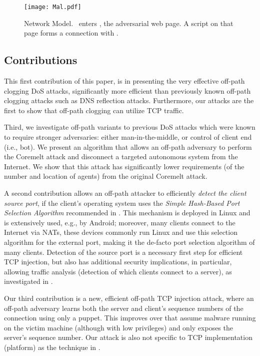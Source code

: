 \documentclass[conference]{IEEEtran}
\newcommand{\scom}{\mbox{}}
\newcommand{\malcom}{\mbox{}}\newcommand{\victimserv}{\mbox{}}\newcommand{\malcoma}{\mbox{}}
\begin{document}
\begin{figure}
  \begin{center}
    \texttt{[image: Mal.pdf]}
  \end{center}
  \caption{Network Model. \wini\ enters \malcom, the adversarial web page. A script on that page forms a connection with \scom.}
   \label{fig:ourmodel}
\end{figure}

\subsection{Contributions}
This first contribution of this paper, is in presenting the very effective off-path clogging DoS attacks, significantly more efficient than previously known off-path clogging attacks such as DNS reflection attacks. Furthermore, our attacks are the first to show that off-path clogging can utilize TCP traffic. 

Third, we investigate off-path variants to previous DoS attacks which were known to require stronger adversaries: either man-in-the-middle, or control of client end (i.e., bot). We present an algorithm that allows an off-path adversary to perform the Coremelt attack and disconnect a targeted autonomous system from the Internet. We show that this attack has significantly lower requirements (of the number and location of agents) from the original Coremelt attack.

A second contribution allows an off-path attacker to efficiently {\em detect the client source port}, if the client's operating system uses the {\em Simple Hash-Based Port Selection Algorithm} recommended in \cite{rfc6056}. This mechanism is deployed in Linux and is extensively used, e.g., by Android; moreover, many clients connect to the Internet via NATs, these devices commonly run Linux and use this selection algorithm for the external port, making it the de-facto port selection algorithm of many clients. Detection of the source port is a necessary first step for efficient TCP injection, but also has additional security implications, in particular, allowing traffic analysis (detection of which clients connect to a server), as investigated in \cite{SpyingInTheDark}. 



Our third contribution is a new, efficient off-path TCP injection attack, where an off-path adversary learns both the server and client's sequence numbers of the connection using only a puppet. This improves over \cite{snptcp,CCS12:tcp} that assume malware running on the victim machine (although with low privileges) and only exposes the server's sequence number. Our attack is also not specific to TCP implementation (platform) as the technique in \cite{woottcp}.
\end{document}
